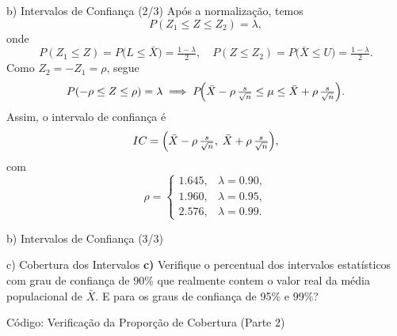\begin{frame}{b) Intervalos de Confiança (2/3)}
Após a normalização, temos
\[
P(Z_1 \le Z \le Z_2) = \lambda,
\]
onde
\[
P(Z_1 \le Z)=P\bigl(L \le \bar X\bigr)=\tfrac{1-\lambda}{2},
\quad
P(Z \le Z_2)=P\bigl(\bar X \le U\bigr)=\tfrac{1-\lambda}{2}.
\]
Como $Z_2=-Z_1=\rho$, segue
\[
P(-\rho \le Z \le \rho)=\lambda
\;\Longrightarrow\;
P\!\Bigl(\bar X - \rho\,\tfrac{s}{\sqrt n} \le \mu \le \bar X + \rho\,\tfrac{s}{\sqrt n}\Bigr).
\]
Assim, o intervalo de confiança é
\[
IC = \Bigl(\bar X - \rho\,\tfrac{s}{\sqrt n},\;\bar X + \rho\,\tfrac{s}{\sqrt n}\Bigr),
\]
com
\[
\rho =
\begin{cases}
1.645, & \lambda=0.90,\\
1.960, & \lambda=0.95,\\
2.576, & \lambda=0.99.
\end{cases}
\]
\end{frame}

\begin{frame}[fragile]{b) Intervalos de Confiança (3/3)}

\end{frame}

\begin{frame}[fragile]{c) Cobertura dos Intervalos}
\textbf{c)} Verifique o percentual dos intervalos estatísticos com grau de confiança de 90\% que realmente contem o valor real da média populacional de $\bar X$. E para os graus de confiança de 95\% e 99\%?

\vspace{0.5em}


\end{frame}

\begin{frame}[fragile]{Código: Verificação da Proporção de Cobertura (Parte 2)}

\end{frame}